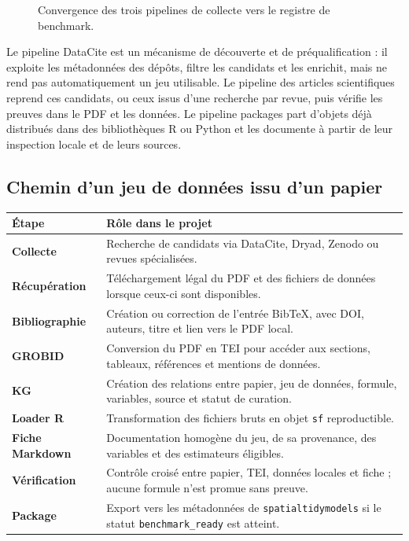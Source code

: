 \documentclass[11pt,a4paper]{article}
\begin{document}
\begin{figure}[H]
{}
\caption{Convergence des trois pipelines de collecte vers le registre de benchmark.}
\end{figure}

Le pipeline DataCite est un mécanisme de découverte et de préqualification : il exploite les métadonnées des dépôts, filtre les candidats et les enrichit, mais ne rend pas automatiquement un jeu utilisable. Le pipeline des articles scientifiques reprend ces candidats, ou ceux issus d'une recherche par revue, puis vérifie les preuves dans le PDF et les données. Le pipeline packages part d'objets déjà distribués dans des bibliothèques R ou Python et les documente à partir de leur inspection locale et de leurs sources.

\subsection{Chemin d'un jeu de données issu d'un papier}

\begin{center}
\small
\begin{tabularx}{\textwidth}{>{\bfseries}p{3.2cm}X}
\toprule
Étape & Rôle dans le projet \\
\midrule
Collecte & Recherche de candidats via DataCite, Dryad, Zenodo ou revues spécialisées. \\
Récupération & Téléchargement légal du PDF et des fichiers de données lorsque ceux-ci sont disponibles. \\
Bibliographie & Création ou correction de l'entrée BibTeX, avec DOI, auteurs, titre et lien vers le PDF local. \\
GROBID & Conversion du PDF en TEI pour accéder aux sections, tableaux, références et mentions de données. \\
KG & Création des relations entre papier, jeu de données, formule, variables, source et statut de curation. \\
Loader R & Transformation des fichiers bruts en objet \texttt{sf} reproductible. \\
Fiche Markdown & Documentation homogène du jeu, de sa provenance, des variables et des estimateurs éligibles. \\
Vérification & Contrôle croisé entre papier, TEI, données locales et fiche ; aucune formule n'est promue sans preuve. \\
Package & Export vers les métadonnées de \texttt{spatialtidymodels} si le statut \texttt{benchmark\_ready} est atteint. \\
\bottomrule
\end{tabularx}
\end{center}
\end{document}
